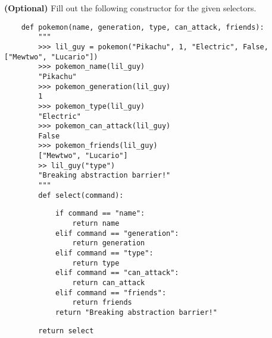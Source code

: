     \begin{blocksection}
    \question \textbf{(Optional)} Fill out the following constructor for the given
    selectors.
    
    \begin{lstlisting}
    def pokemon(name, generation, type, can_attack, friends):
        """
        >>> lil_guy = pokemon("Pikachu", 1, "Electric", False, ["Mewtwo", "Lucario"])
        >>> pokemon_name(lil_guy)
        "Pikachu"
        >>> pokemon_generation(lil_guy)
        1
        >>> pokemon_type(lil_guy)
        "Electric"
        >>> pokemon_can_attack(lil_guy)
        False
        >>> pokemon_friends(lil_guy)
        ["Mewtwo", "Lucario"]
        >> lil_guy("type")
        "Breaking abstraction barrier!"
        """
        def select(command):
    \end{lstlisting}
    
    \begin{solution}[1.8in]
    \begin{lstlisting}
            if command == "name":
                return name
            elif command == "generation":
                return generation
            elif command == "type":
                return type
            elif command == "can_attack":
                return can_attack
            elif command == "friends":
                return friends
            return "Breaking abstraction barrier!"
    \end{lstlisting}
    \end{solution}
    \begin{lstlisting}
        return select
    \end{lstlisting}
    \end{blocksection}

